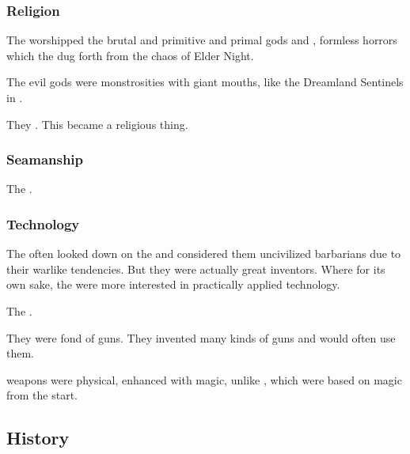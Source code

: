 \subsubsection{Religion}
The \aryothim worshipped the brutal and primitive and primal gods  and , formless horrors which the dug forth from the chaos of Elder Night. 

The evil \aryoth gods were monstrosities with giant mouths, like the Dreamland Sentinels in \cite{MichaelNelson:FallofCthulhuIII}. 

They . 
This became a religious thing. 






\subsubsection{Seamanship}
The \aryothim{} . 





\subsubsection{Technology}
The \quiljaaran{} often looked down on the \aryoth{} and considered them uncivilized barbarians due to their warlike tendencies. 
But they were actually great inventors. 
Where  for its own sake, the \aryothim{} were more interested in practically applied technology. 

The \aryothim {}. 

They were fond of guns. 
They invented many kinds of guns and would often use them. 

\Aryoth{} weapons were physical, enhanced with magic, unlike , which were based on magic from the start. 









\subsection{History}





